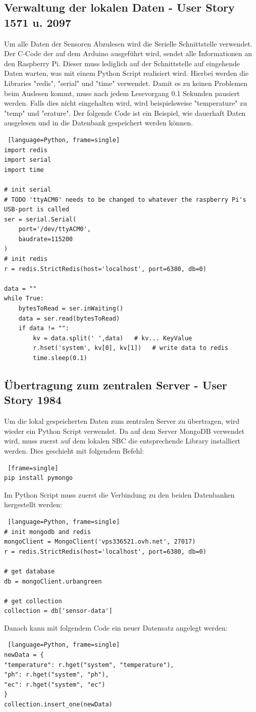 \documentclass[11pt]{article}
\begin{document}
\subsection{Verwaltung der lokalen Daten - User Story 1571 u. 2097}
Um alle Daten der Sensoren Abzulesen wird die Serielle Schnittstelle verwendet. Der C-Code der auf dem Arduino ausgef\"uhrt wird, sendet alle Informationen an den Raspberry Pi. Dieser muss lediglich auf der Schnittstelle auf eingehende Daten warten, was mit einem Python Script realisiert wird. Hierbei werden die Libraries "redis", "serial" und "time" verwendet. Damit es zu keinen Problemen beim Auslesen kommt, muss nach jedem Lesevorgang 0.1 Sekunden pausiert werden. Falls dies nicht eingehalten wird, wird beispielsweise "temperature" zu "temp" und "erature". Der folgende Code ist ein Beispiel, wie dauerhaft Daten ausgelesen und in die Datenbank gespeichert werden k\"onnen.
\begin{lstlisting} [language=Python, frame=single]
import redis
import serial
import time

# init serial
# TODO 'ttyACM0' needs to be changed to whatever the raspberry Pi's USB-port is called
ser = serial.Serial(
	port='/dev/ttyACM0',
	baudrate=115200
)
# init redis
r = redis.StrictRedis(host='localhost', port=6380, db=0)

data = ""
while True:
	bytesToRead = ser.inWaiting()
	data = ser.read(bytesToRead)
	if data != "":
		kv = data.split(' ',data)   # kv... KeyValue
		r.hset('system', kv[0], kv[1])   # write data to redis
		time.sleep(0.1)
\end{lstlisting}

\subsection{\"Ubertragung zum zentralen Server - User Story 1984}
Um die lokal gespeicherten Daten zum zentralen Server zu \"ubertragen, wird wieder ein Python Script verwendet. Da auf dem Server MongoDB verwendet wird, muss zuerst auf dem lokalen SBC die entsprechende Library installiert werden. Dies geschieht mit folgendem Befehl:
\begin{lstlisting} [frame=single]
pip install pymongo	
\end{lstlisting}
Im Python Script muss zuerst die Verbindung zu den beiden Datenbanken hergestellt werden:
\begin{lstlisting} [language=Python, frame=single]
# init mongodb and redis
mongoClient = MongoClient('vps336521.ovh.net', 27017)
r = redis.StrictRedis(host='localhost', port=6380, db=0)

# get database
db = mongoClient.urbangreen

# get collection
collection = db['sensor-data']
\end{lstlisting}
Danach kann mit folgendem Code ein neuer Datensatz angelegt werden:
\begin{lstlisting} [language=Python, frame=single]
newData = {
"temperature": r.hget("system", "temperature"),
"ph": r.hget("system", "ph"),
"ec": r.hget("system", "ec")
}
collection.insert_one(newData)
\end{lstlisting}
\end{document}
